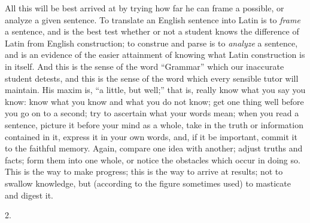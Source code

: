 All this will be best arrived at by trying how far he can frame a
possible, or analyze a given sentence. To translate an English
sentence into Latin is to \emph{frame} a sentence, and is the best
test whether or not a student knows the difference of Latin from
English construction; to construe and parse is to \emph{analyze} a
sentence, and is an evidence of the easier attainment of knowing what
Latin construction is in itself. And this is the sense of the word
``Grammar'' which our inaccurate student detests, and this is
the sense of the word which every sensible tutor will maintain. His
maxim is, ``a little, but well;'' that is, really know what
you say you know: know what you know and what you do not know; get one
thing well before you go on to a second; try to ascertain what your
words mean; when you read a sentence, picture it before your mind as a
whole, take in the truth or information contained in it, express it in
your own words, and, if it be important, commit it to the faithful memory. Again, compare one idea with another; adjust truths
and facts; form them into one whole, or notice the obstacles which
occur in doing so. This is the way to make progress; this is the way
to arrive at results; not to swallow knowledge, but (according to the
figure sometimes used) to masticate and digest it.

2.

